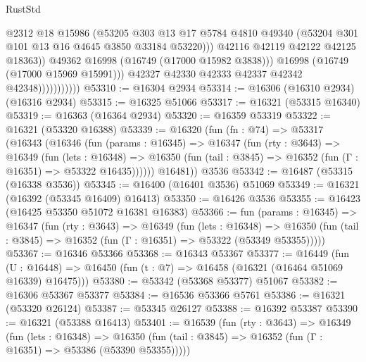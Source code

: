 \begin{lexlean}{RustStd}
\begin{coremodule}
                                    @2312
                                    @18
                                    @15986
                                    (@53205
                                      @303
                                      @13
                                      @17
                                      @5784
                                      @4810
                                      @49340
                                      (@53204 @301 @101 @13 @16 @4645 @3850 @33184 @53220)))
                                  @42116
                                  @42119
                                  @42122
                                  @42125
                                  @18363))
                              @49362
                              @16998
                              (@16749 (@17000 @15982 @3838)))
                            @16998
                            (@16749 (@17000 @15969 @15991)))
                          @42327
                          @42330
                          @42333
                          @42337
                          @42342
                          @42348)))))))))))
@53310 := @16304 @2934
@53314 := @16306 (@16310 @2934) (@16316 @2934)
@53315 := @16325 @51066
@53317 := @16321 (@53315 @16340)
@53319 := @16363 (@16364 @2934)
@53320 := @16359 @53319
@53322 := @16321 (@53320 @16388)
@53339 := @16320
    (fun (fn : @74) =>
    @53317
      (@16343
        (@16346
          (fun (params : @16345) =>
          @16347
            (fun (rty : @3643) =>
            @16349
              (fun (lets : @16348) =>
              @16350 (fun (tail : @3845) => @16352 (fun (Γ : @16351) => @53322 @16435))))))
        @16481))
    @3536
@53342 := @16487 (@53315 (@16338 @3536))
@53345 := @16400 (@16401 @3536) @51069
@53349 := @16321 (@16392 (@53345 @16409) @16413)
@53350 := @16426 @3536
@53355 := @16423 (@16425 @53350 @51072 @16381 @16383)
@53366 := fun (params : @16345) =>
  @16347
    (fun (rty : @3643) =>
    @16349
      (fun (lets : @16348) =>
      @16350 (fun (tail : @3845) => @16352 (fun (Γ : @16351) => @53322 (@53349 @53355)))))
@53367 := @16346 @53366
@53368 := @16343 @53367
@53377 := @16449
    (fun (U : @16448) => @16450 (fun (t : @7) => @16458 (@16321 (@16464 @51069 @16339) @16475)))
@53380 := @53342 (@53368 @53377) @51067
@53382 := @16306 @53367 @53377
@53384 := @16536 @53366 @5761
@53386 := @16321 (@53320 @26124)
@53387 := @53345 @26127
@53388 := @16392 @53387
@53390 := @16321 (@53388 @16413)
@53401 := @16539
    (fun (rty : @3643) =>
    @16349
      (fun (lets : @16348) =>
      @16350 (fun (tail : @3845) => @16352 (fun (Γ : @16351) => @53386 (@53390 @53355)))))

\end{coremodule}
\end{lexlean}
